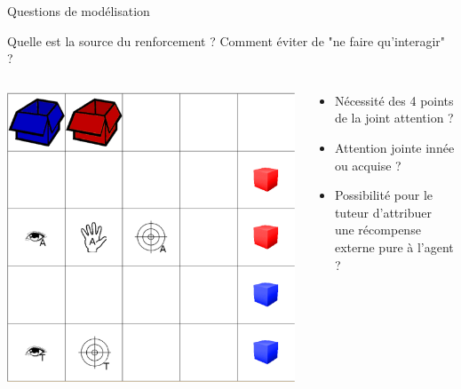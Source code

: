 \documentclass[xcolor=pst,dvips,12pt,english,french]{beamer}
\begin{document}
	\begin{frame}{Questions de modélisation}
		\begin{block}{}
			Quelle est la source du renforcement ? Comment éviter de "ne faire qu'interagir" ?
		\end{block}
		\begin{columns}
			\begin{column}{0.4\textwidth}
				\centering
				\includegraphics[width=\textwidth, trim={0 0 1cm 0, clip}]{images/playroom2.eps}
			\end{column}
			\begin{column}{0.5\textwidth}
				\begin{alertblock}{}
					\begin{itemize}
						\item Nécessité des 4 points de la joint attention ?
						\item Attention jointe innée ou acquise ?
						\item Possibilité pour le tuteur d'attribuer une récompense externe pure à l'agent ?
					\end{itemize}
				\end{alertblock}
			\end{column}
		\end{columns}
	\end{frame}
	
\end{document}
